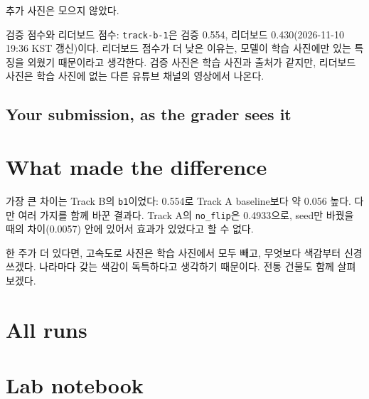 \documentclass[11pt]{article}
\begin{document}
추가 사진은 모으지 않았다.

검증 점수와 리더보드 점수: \texttt{track-b-1}은 검증 0.554, 리더보드 0.430(2026-11-10 19:36 KST 갱신)이다. 리더보드 점수가 더 낮은 이유는, 모델이 학습 사진에만 있는 특징을 외웠기 때문이라고 생각한다. 검증 사진은 학습 사진과 출처가 같지만, 리더보드 사진은 학습 사진에 없는 다른 유튜브 채널의 영상에서 나온다.

\subsection*{Your submission, as the grader sees it}

\section*{What made the difference}

가장 큰 차이는 Track B의 \texttt{b1}이었다: 0.554로 Track A baseline보다 약 0.056 높다.
다만 여러 가지를 함께 바꾼 결과다. Track A의 \texttt{no\_flip}은 0.4933으로, seed만 바꿨을 때의
차이(0.0057) 안에 있어서 효과가 있었다고 할 수 없다.

한 주가 더 있다면, 고속도로 사진은 학습 사진에서 모두 빼고, 무엇보다 색감부터 신경 쓰겠다. 나라마다 갖는 색감이 독특하다고 생각하기 때문이다. 전통 건물도 함께 살펴보겠다.

\section*{All runs}

\section*{Lab notebook}
\end{document}
